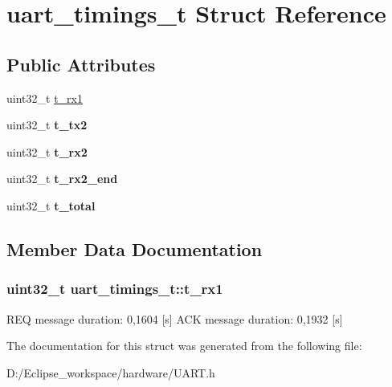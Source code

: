 \hypertarget{structuart__timings__t}{}\section{uart\+\_\+timings\+\_\+t Struct Reference}
\label{structuart__timings__t}
\subsection*{Public Attributes}
\begin{DoxyCompactItemize}
\item 
uint32\+\_\+t \hyperlink{structuart__timings__t_aa2717f4bb8e2062d266f1dd8408d6be6}{t\+\_\+rx1}
\item 
\hypertarget{structuart__timings__t_a5ca23a3f4449ecf8ba3a8ec54f3eb512}{}uint32\+\_\+t {\bfseries t\+\_\+tx2}\label{structuart__timings__t_a5ca23a3f4449ecf8ba3a8ec54f3eb512}

\item 
\hypertarget{structuart__timings__t_a8cc6bc5754a4da9391494c2be77a5cda}{}uint32\+\_\+t {\bfseries t\+\_\+rx2}\label{structuart__timings__t_a8cc6bc5754a4da9391494c2be77a5cda}

\item 
\hypertarget{structuart__timings__t_adbf23d23c6df111482e0bf6430fc3bcc}{}uint32\+\_\+t {\bfseries t\+\_\+rx2\+\_\+end}\label{structuart__timings__t_adbf23d23c6df111482e0bf6430fc3bcc}

\item 
\hypertarget{structuart__timings__t_a7192fc593562e24bca8e6a595a0c5db1}{}uint32\+\_\+t {\bfseries t\+\_\+total}\label{structuart__timings__t_a7192fc593562e24bca8e6a595a0c5db1}

\end{DoxyCompactItemize}


\subsection{Member Data Documentation}
\hypertarget{structuart__timings__t_aa2717f4bb8e2062d266f1dd8408d6be6}{}
\subsubsection[{t\+\_\+rx1}]{\setlength{\rightskip}{0pt plus 5cm}uint32\+\_\+t uart\+\_\+timings\+\_\+t\+::t\+\_\+rx1}\label{structuart__timings__t_aa2717f4bb8e2062d266f1dd8408d6be6}
R\+E\+Q message duration\+: 0,1604 \mbox{[}s\mbox{]} A\+C\+K message duration\+: 0,1932 \mbox{[}s\mbox{]} 

The documentation for this struct was generated from the following file\+:\begin{DoxyCompactItemize}
\item 
D\+:/\+Eclipse\+\_\+workspace/hardware/U\+A\+R\+T.\+h\end{DoxyCompactItemize}
